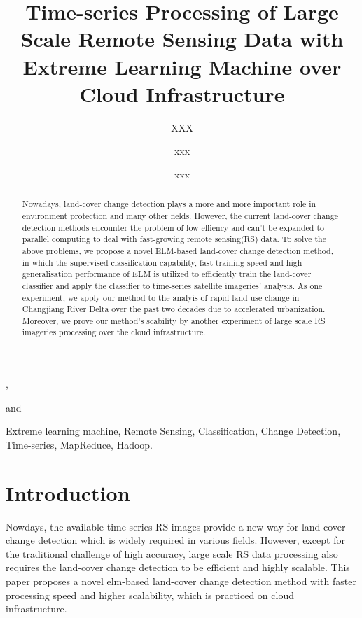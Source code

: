 \documentclass{elsart}
\begin{document}
  

\begin{frontmatter}

\title{Time-series Processing of Large Scale Remote Sensing Data with Extreme Learning Machine over Cloud Infrastructure}

\author[label1]{XXX},
\author[label1,label2]{xxx} and
\author[label1]{xxx}
\address[label1]{Zhejiang University}
\address[label2]{School }

\begin{abstract}
Nowadays, land-cover change detection plays a more and more important role in environment protection and many other fields.
However, the current land-cover change detection methods encounter the problem of low effiency and can't be expanded to parallel computing to deal with fast-growing remote sensing(RS) data.
To solve the above problems, we propose a novel ELM-based land-cover change detection method, in which the supervised classification capability, fast training speed and high generalisation performance of ELM is utilized to efficiently train the land-cover classifier and apply the classifier to time-series satellite imageries' analysis.
As one experiment, we apply our method to the analyis of rapid land use change in Changjiang River Delta over the past two decades due to accelerated urbanization.
Moreover, we prove our method's scability by another experiment of large scale RS imageries processing over the cloud infrastructure.
\end{abstract}

\begin{keyword}
Extreme learning machine, Remote Sensing, Classification, Change Detection, Time-series, MapReduce, Hadoop.
\end{keyword}

\end{frontmatter}


\section{Introduction}
Nowdays, the available time-series RS images provide a new way for land-cover change detection which is widely required in various fields.
However, except for the traditional challenge of high accuracy, large scale RS data processing also requires the land-cover change detection to be efficient and highly scalable. 
This paper proposes a novel elm-based land-cover change detection method with faster processing speed and higher scalability, which is practiced on cloud infrastructure. 
\end{document}
